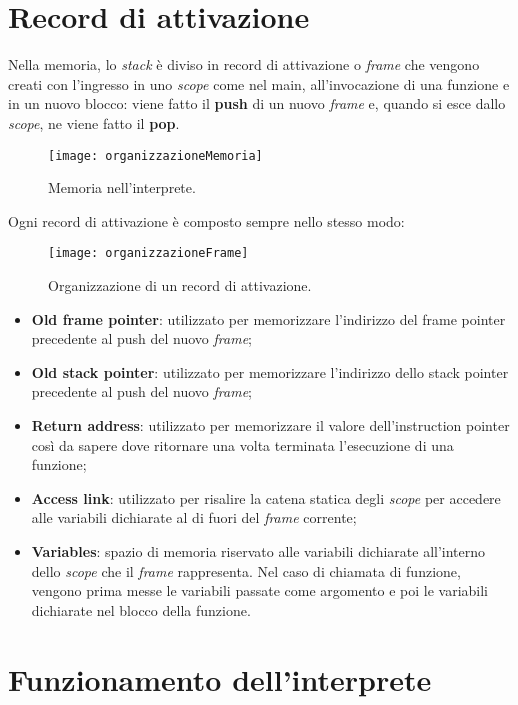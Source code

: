 \documentclass[../report.tex]{subfiles}
\begin{document}
\section{Record di attivazione}\label{s:record-di-attivazione}
Nella memoria, lo \textit{stack} è diviso in record di attivazione o \textit{frame} che vengono creati con l'ingresso in uno \textit{scope} come nel main, all'invocazione di una funzione e in un nuovo blocco: viene fatto il \textbf{push} di un nuovo \textit{frame} e, quando si esce dallo \textit{scope}, ne viene fatto il \textbf{pop}.
\begin{figure}[H]
    \centering
    \texttt{[image: organizzazioneMemoria]}
    \caption{Memoria nell'interprete.}
\end{figure}
Ogni record di attivazione è composto sempre nello stesso modo:
\begin{figure}[H]
    \centering
    \texttt{[image: organizzazioneFrame]}
    \caption{Organizzazione di un record di attivazione.}
\end{figure}
\begin{itemize}
    \item \textbf{Old frame pointer}: utilizzato per memorizzare l'indirizzo del frame pointer precedente al push del nuovo \textit{frame};
    \item \textbf{Old stack pointer}: utilizzato per memorizzare l'indirizzo dello stack pointer precedente al push del nuovo \textit{frame};
    \item \textbf{Return address}: utilizzato per memorizzare il valore dell'instruction pointer così da sapere dove ritornare una volta terminata l'esecuzione di una funzione;
    \item \textbf{Access link}: utilizzato per risalire la catena statica degli \textit{scope} per accedere alle variabili dichiarate al di fuori del \textit{frame} corrente;
    \item \textbf{Variables}: spazio di memoria riservato alle variabili dichiarate all'interno dello \textit{scope} che il \textit{frame} rappresenta. Nel caso di chiamata di funzione, vengono prima messe le variabili passate come argomento e poi le variabili dichiarate nel blocco della funzione.
\end{itemize}

\section{Funzionamento dell'interprete}\label{s:funzionamento-interprete}
\end{document}
